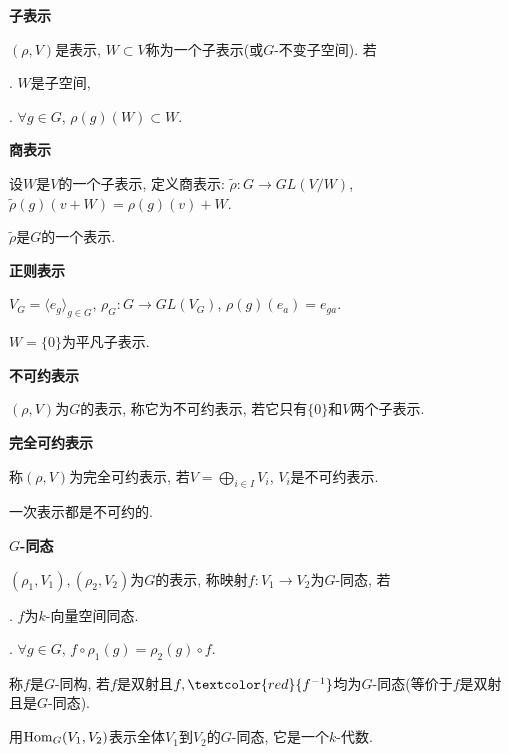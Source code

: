 \begin{definition} \textbf{子表示}\par
    \qquad $(\rho,V)$是表示, $W\subset V$称为一个子表示(或$G$-不变子空间). 若\par
    . $W$是子空间,\par
    . $\forall g\in G$, $\rho(g)(W)\subset W$.

\end{definition}

\begin{definition} \textbf{商表示}\par
    设$W$是$V$的一个子表示, 定义商表示: 
    $\tilde{\rho}:G\rightarrow GL(V/W)$, $\tilde{\rho}(g)(v+W)=\rho(g)(v)+W$.

\end{definition}

\begin{exercise}
    $\tilde{\rho}$是$G$的一个表示.
\end{exercise}

\begin{example} \textbf{正则表示}\par
    \qquad $V_G=\langle e_g\rangle_{g\in G}$, 
    $\rho_G:G\rightarrow GL(V_G)$, $\rho(g)(e_a)=e_{ga}$.
\end{example}

\begin{example}
    $W=\{0\}$为平凡子表示.
\end{example}

\begin{definition} \textbf{不可约表示}\par
    \qquad $(\rho,V)$为$G$的表示, 称它为不可约表示, 若它只有$\{0\}$和$V$两个子表示.
\end{definition}

\begin{definition} \textbf{完全可约表示}\par
    \qquad 称$(\rho,V)$为完全可约表示, 
    若$V=\bigoplus\limits_{i\in I} V_i$, $V_i$是不可约表示.
\end{definition}

\begin{exercise}
    一次表示都是不可约的.
\end{exercise}

\begin{definition} \textbf{$G$-同态}\par
    \qquad $(\rho_1,V_1), (\rho_2,V_2)$为$G$的表示, 
    称映射$f:V_1\rightarrow V_2$为$G$-同态, 若\par
    . $f$为$k$-向量空间同态.\par
    . $\forall g\in G$, $f\circ \rho_1(g)=\rho_2(g)\circ f$.\par
    \qquad 称$f$是$G$-同构, 若$f$是双射且$f,\textcolor{red}{f^{-1}}$均为$G$-同态(等价于$f$是双射且是$G$-同态).\par
    \qquad 用$\operatorname{Hom}_G(V_1, V_2)$表示全体$V_1$到$V_2$的$G$-同态, 它是一个$k$-代数.
\end{definition}

